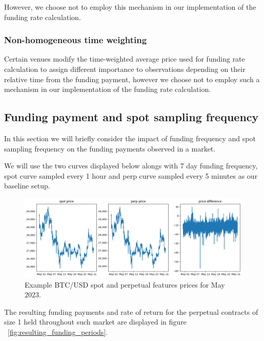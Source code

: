 \documentclass[10pt]{article}
\begin{document}
However, we choose not to employ this mechanism in our implementation of the funding rate calculation.
      
\subsubsection{Non-homogeneous time weighting}

Certain venues modify the time-weighted average price used for funding rate calculation to assign different importance to observations depending on their relative time from the funding payment, however we choose not to employ such a mechanism in our implementation of the funding rate calculation.

\subsection{Funding payment and spot sampling frequency}

In this section we will briefly consider the impact of funding frequency and spot sampling frequency on the funding payments observed in a market.

We will use the two curves displayed below alongs with 7 day funding frequency, spot curve sampled every 1 hour and perp curve sampled every 5 minutes as our baseline setup.

\begin{figure}[h]
    \centering
    \includegraphics[width=\textwidth]{./plots/example_curves.png}
    \caption{Example BTC/USD spot and perpetual features prices for May 2023.}
    \label{fig:example_curves}
\end{figure}

The resulting funding payments and rate of return for the perpetual contracts of size 1 held throughout such market are displayed in figure ~\ref{fig:resulting_funding_periods}.
\end{document}
